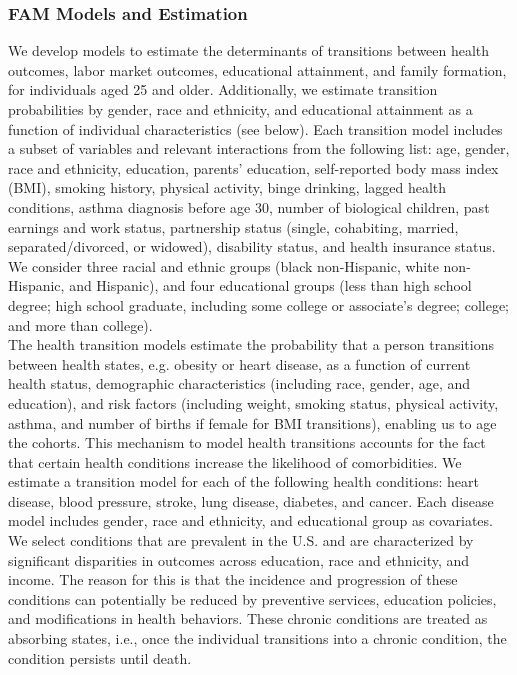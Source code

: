 
\subsubsection{FAM Models and Estimation}
\label{section:FAM_models}

\noindent We develop models to estimate the determinants of transitions between health outcomes, labor market outcomes, educational attainment, and family formation, for individuals aged 25 and older.
Additionally, we estimate transition probabilities by gender, race and ethnicity, and educational attainment as a function of individual characteristics (see below).
Each transition model includes a subset of variables and relevant interactions from the following list: age, gender, race and ethnicity, education, parents' education, self-reported body mass index (BMI), smoking history, physical activity, binge drinking, lagged health conditions, asthma diagnosis before age 30, number of biological children, past earnings and work status, partnership status (single, cohabiting, married, separated/divorced, or widowed), disability status, and health insurance status.
We consider three racial and ethnic groups (black non-Hispanic, white non-Hispanic, and Hispanic), and four educational groups (less than high school degree; high school graduate, including some college or associate's degree; college; and more than college). \\

\noindent The health transition models estimate the probability that a person transitions between health states, e.g. obesity or heart disease, as a function of current health status, demographic characteristics (including race, gender, age, and education), and risk factors (including weight, smoking status, physical activity, asthma, and number of births if female for BMI transitions), enabling us to age the cohorts. This mechanism to model health transitions accounts for the fact that certain health conditions increase the likelihood of comorbidities.
We estimate a transition model for each of the following health conditions: heart disease, blood pressure, stroke, lung disease, diabetes, and cancer. Each disease model includes gender, race and ethnicity, and educational group as covariates.
We select conditions that are prevalent in the U.S. and are characterized by significant disparities in outcomes across education, race and ethnicity, and income. 
The reason for this is that the incidence and progression of these conditions can potentially be reduced by preventive services, education policies, and modifications in health behaviors. 
These chronic conditions are treated as absorbing states, i.e., once the individual transitions into a chronic condition, the condition persists until death. \\

